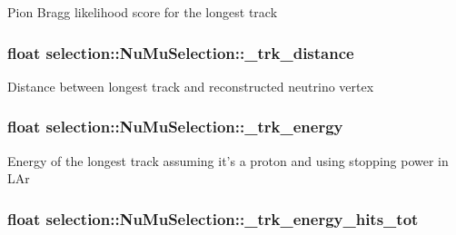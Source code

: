 Pion Bragg likelihood score for the longest track \hypertarget{classselection_1_1NuMuSelection_a4d2e1ceec2811a4493f964212b744e26}{
\subsubsection[{\-\_\-trk\-\_\-distance}]{\setlength{\rightskip}{0pt plus 5cm}float selection\-::\-Nu\-Mu\-Selection\-::\-\_\-trk\-\_\-distance\hspace{0.3cm}{\ttfamily [private]}}}\label{classselection_1_1NuMuSelection_a4d2e1ceec2811a4493f964212b744e26}
Distance between longest track and reconstructed neutrino vertex \hypertarget{classselection_1_1NuMuSelection_a505f81bb9d920d0304d988a2f3fadbc2}{
\subsubsection[{\-\_\-trk\-\_\-energy}]{\setlength{\rightskip}{0pt plus 5cm}float selection\-::\-Nu\-Mu\-Selection\-::\-\_\-trk\-\_\-energy\hspace{0.3cm}{\ttfamily [private]}}}\label{classselection_1_1NuMuSelection_a505f81bb9d920d0304d988a2f3fadbc2}
Energy of the longest track assuming it's a proton and using stopping power in L\-Ar \hypertarget{classselection_1_1NuMuSelection_a62b2fc85963f5b8c09b9a6306afbb84a}{
\subsubsection[{\-\_\-trk\-\_\-energy\-\_\-hits\-\_\-tot}]{\setlength{\rightskip}{0pt plus 5cm}float selection\-::\-Nu\-Mu\-Selection\-::\-\_\-trk\-\_\-energy\-\_\-hits\-\_\-tot\hspace{0.3cm}{\ttfamily [private]}}}\label{classselection_1_1NuMuSelection_a62b2fc85963f5b8c09b9a6306afbb84a}
